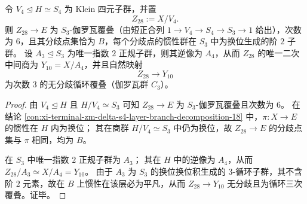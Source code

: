 \begin{conclusion}\label{con:xi-terminal-zm-delta-v4-s3-resolvent-z28-etale-c3}
令 \(V_4\trianglelefteq H\simeq S_4\) 为 Klein 四元子群，并置
\[
Z_{28}:=X/V_4.
\]
则 \(Z_{28}\to E\) 为 \(S_3\)-伽罗瓦覆叠（由短正合列 \(1\to V_4\to S_4\to S_3\to 1\) 给出），次数为 \(6\)，且其分歧点集恰为 \(B\)，每个分歧点的惯性群在 \(S_3\) 中为换位生成的阶 \(2\) 子群。
设 \(A_3\trianglelefteq S_3\) 为唯一指数 \(2\) 正规子群，则其逆像为 \(A_4\)，从而 \(Z_{28}\) 的唯一二次中间商为 \(Y_{10}=X/A_4\)，并且自然映射
\[
Z_{28}\longrightarrow Y_{10}
\]
为次数 \(3\) 的无分歧循环覆叠（伽罗瓦群 \(C_3\)）。
\end{conclusion}
\begin{proof}
由 \(V_4\trianglelefteq H\) 且 \(H/V_4\simeq S_3\) 可知 \(Z_{28}\to E\) 为 \(S_3\)-伽罗瓦覆叠且次数为 \(6\)。
在结论 \ref{con:xi-terminal-zm-delta-s4-layer-branch-decomposition-18} 中，\(\pi:X\to E\) 的惯性在 \(H\) 内为换位；
其在商群 \(H/V_4\simeq S_3\) 中仍为换位，故 \(Z_{28}\to E\) 的分歧点集与 \(\pi\) 相同，均为 \(B\)。
\par
在 \(S_3\) 中唯一指数 \(2\) 正规子群为 \(A_3\)；
其在 \(H\) 中的逆像为 \(A_4\)，从而 \(Z_{28}/A_3\simeq X/A_4=Y_{10}\)。
由于 \(A_3\) 为 \(S_3\) 的换位换位积生成的 \(3\)-循环子群，其不含阶 \(2\) 元素，故在 \(B\) 上惯性在该层必为平凡，从而 \(Z_{28}\to Y_{10}\) 无分歧且为循环三次覆叠。证毕。
\end{proof}

